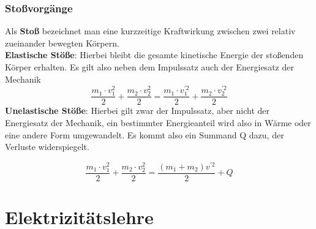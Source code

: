 \documentclass[12pt,a4paper,ngerman]{article}
\begin{document}
\subsubsection*{Stoßvorgänge}
Als \textbf{Stoß} bezeichnet man eine kurzzeitige Kraftwirkung zwischen zwei relativ zueinander bewegten Körpern. \\
\textbf{Elastische Stöße}: Hierbei bleibt die gesamte kinetische Energie der stoßenden Körper erhalten. 
Es gilt also neben dem Impulssatz auch der Energiesatz der Mechanik 
\begin{equation}
\frac{m_1\cdot v_1^2}{2} + \frac{m_2 \cdot v_2^2}{2} = \frac{m_1 \cdot v_1^{\prime2}}{2} + \frac{m_2 \cdot v_2^{\prime2}}{2}
\end{equation}
\textbf{Unelastische Stöße}: Hierbei gilt zwar der Impulssatz, aber nicht der Energiesatz der Mechanik, ein bestimmter Energieanteil wird also in Wärme oder eine andere Form umgewandelt. Es kommt also ein Summand Q dazu, der Verluste widerspiegelt. 

\begin{equation}
\frac{m_1\cdot v_1^2}{2} + \frac{m_2 \cdot v_2^2}{2} = \frac{(m_1 + m_2)  v^{\prime2}}{2} + Q
\end{equation}

\pagebreak

\section{Elektrizitätslehre}
\end{document}
